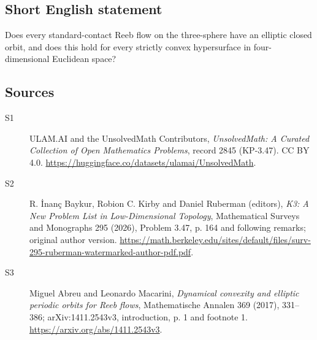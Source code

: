 \documentclass[11pt]{article}
\begin{document}
\subsection{Short English statement}
Does every standard-contact Reeb flow on the three-sphere have an elliptic closed orbit, and does this hold for every strictly convex hypersurface in four-dimensional Euclidean space?
\subsection{Sources}
\begin{description}
\item[\hypertarget{source:2845:1}{S1}] ULAM.AI and the UnsolvedMath Contributors, \emph{UnsolvedMath: A Curated Collection of Open Mathematics Problems}, record 2845 (KP-3.47). CC BY 4.0. \url{https://huggingface.co/datasets/ulamai/UnsolvedMath}.
\item[\hypertarget{source:2845:2}{S2}] R. İnanç Baykur, Robion C. Kirby and Daniel Ruberman (editors), \emph{K3: A New Problem List in Low-Dimensional Topology}, Mathematical Surveys and Monographs 295 (2026), Problem 3.47, p. 164 and following remarks; original author version. \url{https://math.berkeley.edu/sites/default/files/surv-295-ruberman-watermarked-author-pdf.pdf}.
\item[\hypertarget{source:2845:3}{S3}] Miguel Abreu and Leonardo Macarini, \emph{Dynamical convexity and elliptic periodic orbits for Reeb flows}, Mathematische Annalen 369 (2017), 331--386; arXiv:1411.2543v3, introduction, p. 1 and footnote 1. \url{https://arxiv.org/abs/1411.2543v3}.
\end{description}
\label{end:2845}
\end{document}
